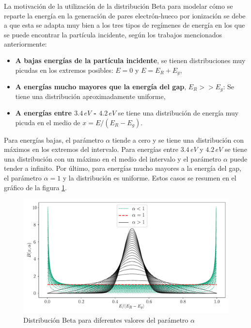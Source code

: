 La motivación de la utilización de la distribución Beta para modelar cómo se reparte la energía en la generación de pares electrón-hueco por ionización se debe a que esta se adapta muy bien a los tres tipos de regímenes de energía en los que se puede encontrar la partícula incidente, según los trabajos mencionados anteriormente:
\begin{itemize}
    \item \textbf{A bajas energías de la partícula incidente}, se tienen distribuciones muy picudas en los extremos posibles: $E = 0$ y $E = E_{R}+E_{g}$,
    \item \textbf{A energías mucho mayores que la energía del gap}, $E_{R} >> E_{g}$: Se tiene una distribución aproximadamente uniforme,
    \item \textbf{A energías entre $3.4\,\si{eV}$ - $4.2\,\si{eV}$} se tiene una distribución de energía muy picuda en el medio de $x = E/(E_{R} - E_{g})$.
\end{itemize}
Para energías bajas, el parámetro $\alpha$ tiende a cero y se tiene una distribución con máximos en los extremos del intervalo. Para energías entre $3.4\,\si{eV}$ y $4.2\,\si{eV}$ se tiene una distribución con un máximo en el medio del intervalo y el parámetro $\alpha$ puede tender a infinito. Por último, para energías mucho mayores a la energía del gap, el parámetro $\alpha = 1$ y la distribución es uniforme. Estos casos se resumen en el gráfico de la figura \ref{fig:BetaDist}.
\begin{figure}%
    \centering
        \includegraphics[scale=0.5]{Figs/BetaDistFig.pdf}
    \caption{\footnotesize{Distribución Beta para diferentes valores del parámetro $\alpha$}}
    \label{fig:BetaDist}
\end{figure}
